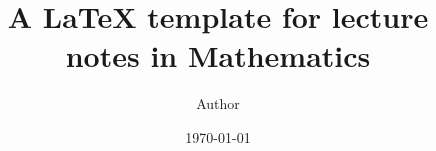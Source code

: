 \documentclass[../main.tex]{subfiles}
\begin{document}
    
\title{A \LaTeX{} template for lecture notes in Mathematics}
\author{Author}
\date{\today}

\maketitle
\end{document}
